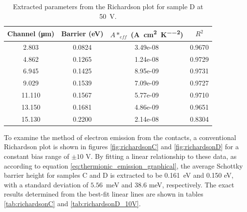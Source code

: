 \begin{refsection}
\begin{table}[h]
    \centering
    \begin{tabular}{|c|c|c|c|}
        \hline
        Channel (\si{\micro\metre}) & Barrier (\si{\electronvolt}) & $A*_{eff}$ (\si{\ampere\per\centi\metre\squared\per\kelvin\squared}) & $R^{2}$\\ \hline
        2.803 & 0.0824  & 3.49e-08 &0.9670 \\ 
        4.862 & 0.1265  & 1.24e-08 &0.9729 \\ 
        6.945 & 0.1425 & 8.95e-09 &0.9731 \\ 
        9.029 & 0.1539 & 7.09e-09 &0.9727 \\ 
        11.110 & 0.1567  & 5.77e-09 &0.9710 \\ 
        13.150 & 0.1681  & 4.86e-09 &0.9651 \\ 
        15.130 & 0.2200 & 2.14e-08 &0.8304 \\ 
        \hline
    \end{tabular}
    \caption{Extracted parameters from the Richardson plot for sample D at 50~\si{\volt}.}
    \label{tab:richardsonD_50V}
\end{table}

To examine the method of electron emission from the contacts, a conventional Richardson plot is shown in figures \ref{fig:richardsonC} and \ref{fig:richardsonD} for a constant bias range of $\pm10$ \si{\volt}. By fitting a linear relationship to these data, as according to equation \ref{eq:thermionic_emission_graphical}, the average Schottky barrier height for samples C and D is extracted to be 0.161~\si{\electronvolt} and 0.150 \si{\electronvolt}, with a standard deviation of $5.56$~\si{\milli\electronvolt} and $38.6$ \si{\milli\electronvolt}, respectively. The exact results determined from the best-fit linear lines are shown in tables \ref{tab:richardsonC} and \ref{tab:richardsonD_10V}.


\end{refsection}
